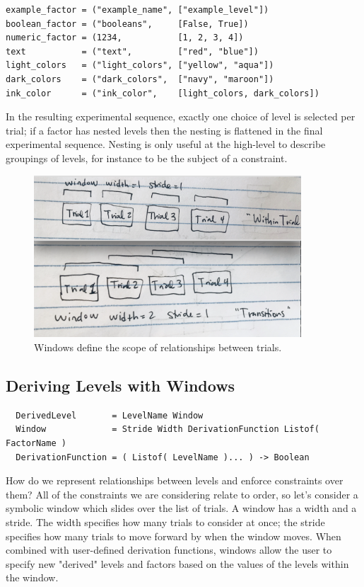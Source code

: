 \begin{verbatim}
example_factor = ("example_name", ["example_level"])
boolean_factor = ("booleans",     [False, True])
numeric_factor = (1234,           [1, 2, 3, 4])
text           = ("text",         ["red", "blue"])
light_colors   = ("light_colors", ["yellow", "aqua"])
dark_colors    = ("dark_colors",  ["navy", "maroon"])
ink_color      = ("ink_color",    [light_colors, dark_colors])
\end{verbatim}

In the resulting experimental sequence, exactly one choice of level is selected per trial; if a factor has nested levels then the nesting is flattened in the final experimental sequence. Nesting is only useful at the high-level to describe groupings of levels, for instance to be the subject of a constraint.

\begin{figure}[t]
    \centerline{\includegraphics[origin=c,width=10cm]{fig_windows}}
    \caption{Windows define the scope of relationships between trials.}%
    \label{fig:windows}%
\end{figure}


\subsection{Deriving Levels with Windows}

\begin{verbatim}
  DerivedLevel       = LevelName Window
  Window             = Stride Width DerivationFunction Listof( FactorName )
  DerivationFunction = ( Listof( LevelName )... ) -> Boolean
\end{verbatim}

How do we represent relationships between levels and enforce constraints over them? All of the constraints we are considering relate to order, so let's consider a symbolic window which slides over the list of trials. A window has a width and a stride. The width specifies how many trials to consider at once; the stride specifies how many trials to move forward by when the window moves. When combined with user-defined derivation functions, windows allow the user to specify new "derived" levels and factors based on the values of the levels within the window.

